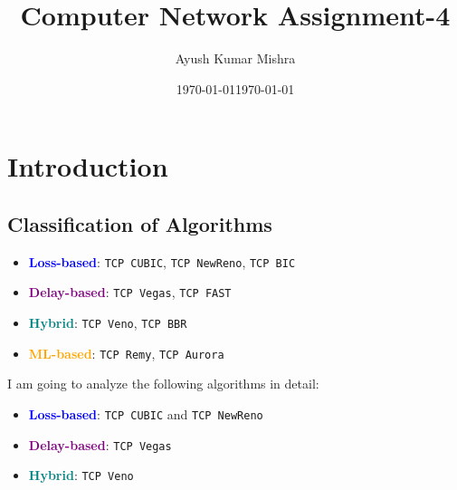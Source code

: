 \documentclass[11pt,a4paper]{article}
\title{\textcolor{primaryColor}{\Huge\textbf{Computer Network Assignment-4}}}
\author{\textcolor{secondaryColor}{\Large Ayush Kumar Mishra}}
\date{\textcolor{secondaryColor}{\today}}
\begin{document}
\maketitle

\newpage

\date{\today}
\maketitle

\section{\textcolor{sectioncolor}{Introduction}}
\subsection{\textcolor{subsectioncolor}{Classification of Algorithms}}

\begin{itemize}
    \item \textbf{\textcolor{blue}{Loss-based}}: \texttt{TCP CUBIC}, \texttt{TCP NewReno}, \texttt{TCP BIC}
    \item \textbf{\textcolor{purple}{Delay-based}}: \texttt{TCP Vegas}, \texttt{TCP FAST}
    \item \textbf{\textcolor{teal}{Hybrid}}: \texttt{TCP Veno}, \texttt{TCP BBR}
    \item \textbf{\textcolor{orange}{ML-based}}: \texttt{TCP Remy}, \texttt{TCP Aurora}
\end{itemize}

I am going to analyze the following algorithms in detail:

\begin{itemize}
    \item \textbf{\textcolor{blue}{Loss-based}}: \texttt{TCP CUBIC} and \texttt{TCP NewReno}
    \item \textbf{\textcolor{purple}{Delay-based}}: \texttt{TCP Vegas}
    \item \textbf{\textcolor{teal}{Hybrid}}: \texttt{TCP Veno}
\end{itemize}


\end{document}
